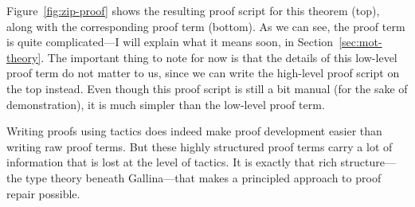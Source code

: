 Figure~\ref{fig:zip-proof} shows the resulting proof script for this theorem (top), along with the corresponding proof term (bottom).
As we can see, the proof term is quite complicated---I will explain what it means soon, in Section~\ref{sec:mot-theory}.
The important thing to note for now is that the details of this low-level proof term do not matter to us,
since we can write the high-level proof script on the top instead.
Even though this proof script is still a bit manual (for the sake of demonstration),
it is much simpler than the low-level proof term.

Writing proofs using tactics does indeed make proof development easier than writing raw proof terms.
But these highly structured proof terms carry a lot of information that is lost at the level of tactics.
It is exactly that rich structure---the type theory beneath Gallina---that makes a principled approach to proof repair possible.





